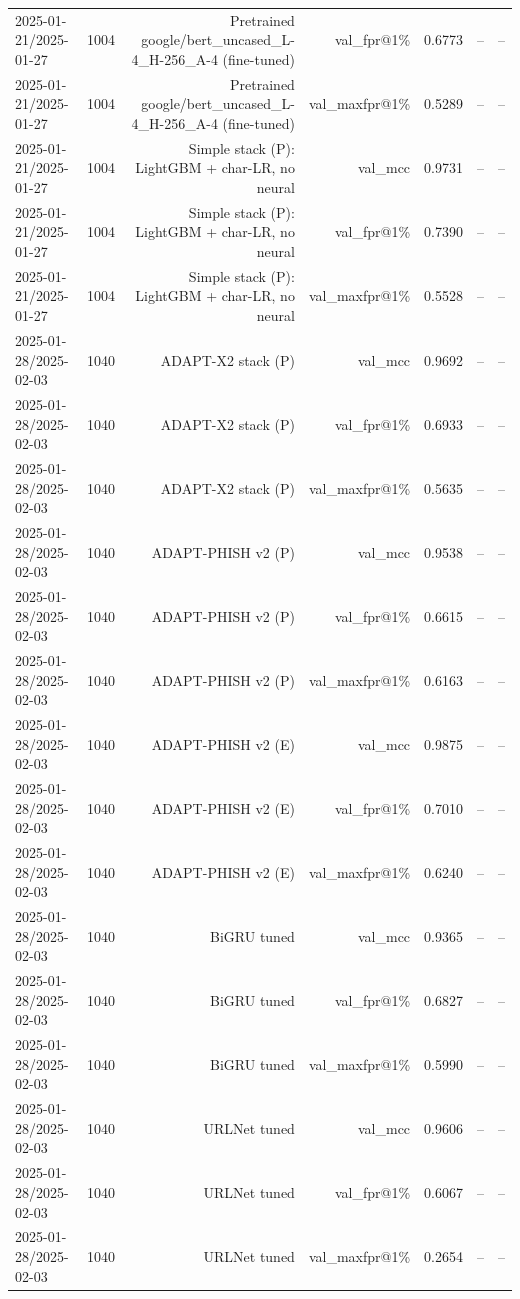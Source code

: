 \begin{table}[t]
\begin{tabular}{llrrrrr}
2025-01-21/2025-01-27 & 1004 & Pretrained google/bert\_uncased\_L-4\_H-256\_A-4 (fine-tuned) & val\_fpr@1\% & 0.6773 & -- & -- \\
2025-01-21/2025-01-27 & 1004 & Pretrained google/bert\_uncased\_L-4\_H-256\_A-4 (fine-tuned) & val\_maxfpr@1\% & 0.5289 & -- & -- \\
2025-01-21/2025-01-27 & 1004 & Simple stack (P): LightGBM + char-LR, no neural & val\_mcc & 0.9731 & -- & -- \\
2025-01-21/2025-01-27 & 1004 & Simple stack (P): LightGBM + char-LR, no neural & val\_fpr@1\% & 0.7390 & -- & -- \\
2025-01-21/2025-01-27 & 1004 & Simple stack (P): LightGBM + char-LR, no neural & val\_maxfpr@1\% & 0.5528 & -- & -- \\
2025-01-28/2025-02-03 & 1040 & ADAPT-X2 stack (P) & val\_mcc & 0.9692 & -- & -- \\
2025-01-28/2025-02-03 & 1040 & ADAPT-X2 stack (P) & val\_fpr@1\% & 0.6933 & -- & -- \\
2025-01-28/2025-02-03 & 1040 & ADAPT-X2 stack (P) & val\_maxfpr@1\% & 0.5635 & -- & -- \\
2025-01-28/2025-02-03 & 1040 & ADAPT-PHISH v2 (P) & val\_mcc & 0.9538 & -- & -- \\
2025-01-28/2025-02-03 & 1040 & ADAPT-PHISH v2 (P) & val\_fpr@1\% & 0.6615 & -- & -- \\
2025-01-28/2025-02-03 & 1040 & ADAPT-PHISH v2 (P) & val\_maxfpr@1\% & 0.6163 & -- & -- \\
2025-01-28/2025-02-03 & 1040 & ADAPT-PHISH v2 (E) & val\_mcc & 0.9875 & -- & -- \\
2025-01-28/2025-02-03 & 1040 & ADAPT-PHISH v2 (E) & val\_fpr@1\% & 0.7010 & -- & -- \\
2025-01-28/2025-02-03 & 1040 & ADAPT-PHISH v2 (E) & val\_maxfpr@1\% & 0.6240 & -- & -- \\
2025-01-28/2025-02-03 & 1040 & BiGRU tuned & val\_mcc & 0.9365 & -- & -- \\
2025-01-28/2025-02-03 & 1040 & BiGRU tuned & val\_fpr@1\% & 0.6827 & -- & -- \\
2025-01-28/2025-02-03 & 1040 & BiGRU tuned & val\_maxfpr@1\% & 0.5990 & -- & -- \\
2025-01-28/2025-02-03 & 1040 & URLNet tuned & val\_mcc & 0.9606 & -- & -- \\
2025-01-28/2025-02-03 & 1040 & URLNet tuned & val\_fpr@1\% & 0.6067 & -- & -- \\
2025-01-28/2025-02-03 & 1040 & URLNet tuned & val\_maxfpr@1\% & 0.2654 & -- & -- \\

\end{tabular}
\end{table}
